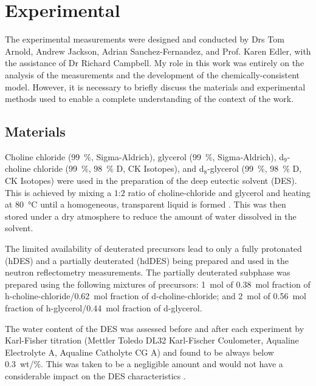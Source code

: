 \section{Experimental}
The experimental measurements were designed and conducted by Drs Tom Arnold, Andrew Jackson, Adrian Sanchez-Fernandez, and Prof. Karen Edler, with the assistance of Dr Richard Campbell.
My role in this work was entirely on the analysis of the measurements and the development of the chemically-consistent model.
However, it is necessary to briefly discuss the materials and experimental methods used to enable a complete understanding of the context of the work.

\subsection{Materials}
Choline chloride (\SI{99}{\percent}, Sigma-Aldrich), glycerol (\SI{99}{\percent}, Sigma-Aldrich), d$_{9}$-choline chloride (\SI{99}{\percent}, \SI{98}{\percent} D, CK Isotopes), and d$_{8}$-glycerol (\SI{99}{\percent}, \SI{98}{\percent} D, CK Isotopes) were used in the preparation of the deep eutectic solvent (DES).
This is achieved by mixing a $1$:$2$ ratio of choline-chloride and glycerol and heating at \SI{80}{\celsius} until a homogeneous, transparent liquid is formed \cite{smith_deep_2014}.
This was then stored under a dry atmosphere to reduce the amount of water dissolved in the solvent.

The limited availability of deuterated precursors lead to only a fully protonated (hDES) and a partially deuterated (hdDES) being prepared and used in the neutron reflectometry measurements.
The partially deuterated subphase was prepared using the following mixtures of precursors: \SI{1}{\mole} of \SI{0.38}{\mole} fraction of h-choline-chloride/\SI{0.62}{\mole} fraction of d-choline-chloride; and \SI{2}{\mole} of \SI{0.56}{\mole} fraction of h-glycerol/\SI{0.44}{\mole} fraction of d-glycerol.

The water content of the DES was assessed before and after each experiment by Karl-Fisher titration (Mettler Toledo DL32 Karl-Fischer Coulometer, Aqualine Electrolyte A, Aqualine Catholyte CG A) and found to be always below \SI{0.3}{wt/\percent}.
This was taken to be a negligible amount and would not have a considerable impact on the DES characteristics \cite{hammond_liquid_2016,hammond_resilience_2017}.

